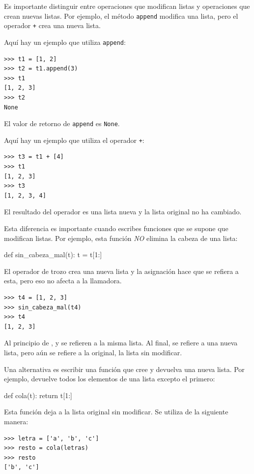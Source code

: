 Es importante distinguir entre operaciones que
modifican listas y operaciones que crean nuevas listas.  Por
ejemplo, el método \texttt{append} modifica una lista, pero el
operador \texttt{+} crea una nueva lista.

Aquí hay un ejemplo que utiliza \texttt{append}:
%
\begin{Verbatim}[frame=single]
>>> t1 = [1, 2]
>>> t2 = t1.append(3)
>>> t1
[1, 2, 3]
>>> t2
None
\end{Verbatim}
%
El valor de retorno de \texttt{append} es \texttt{None}.

Aquí hay un ejemplo que utiliza el operador \texttt{+}:
%
\begin{Verbatim}[frame=single]
>>> t3 = t1 + [4]
>>> t1
[1, 2, 3]
>>> t3
[1, 2, 3, 4]
\end{Verbatim}
%
El resultado del operador es una lista nueva y la lista original no ha
cambiado.

Esta diferencia es importante cuando escribes funciones que
se supone que modifican listas.  Por ejemplo, esta función
{\em NO} elimina la cabeza de una lista:
%
\begin{python}[frame=single]
def sin_cabeza_mal(t):
    t = t[1:]              
\end{python}
%
El operador de trozo crea una nueva lista y la asignación
hace que  se refiera a esta, pero eso no afecta a la llamadora.
%
\begin{Verbatim}[frame=single]
>>> t4 = [1, 2, 3]
>>> sin_cabeza_mal(t4)
>>> t4
[1, 2, 3]
\end{Verbatim}
%
Al principio de ,  y 
se refieren a la misma lista.  Al final,  se refiere a una nueva lista,
pero  aún se refiere a la original, la lista sin modificar.

Una alternativa es escribir una función que cree y
devuelva una nueva lista.  Por
ejemplo,  devuelve todos los elementos
de una lista excepto el primero:

\begin{python}[frame=single]
def cola(t):
    return t[1:]
\end{python}
%
Esta función deja a la lista original sin modificar.
Se utiliza de la siguiente manera:

\begin{Verbatim}[frame=single]
>>> letra = ['a', 'b', 'c']
>>> resto = cola(letras)
>>> resto
['b', 'c']
\end{Verbatim}



